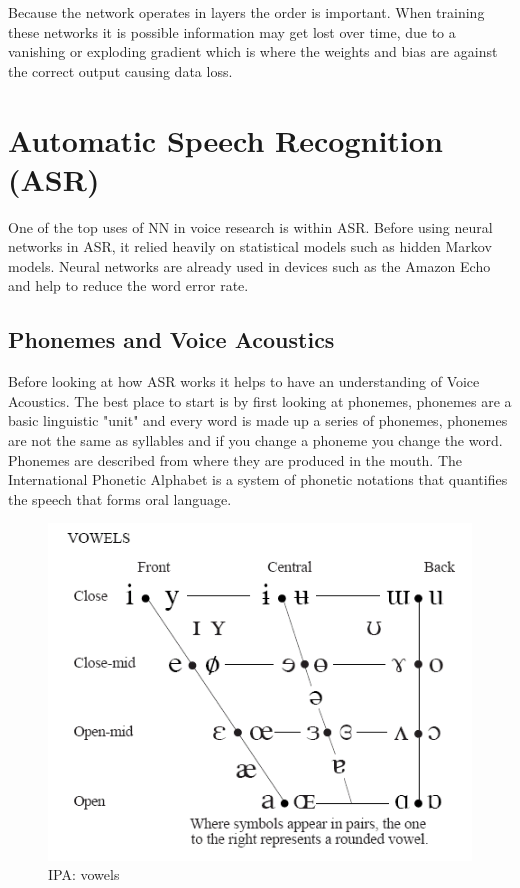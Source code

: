 \documentclass[11pt]{article}
\begin{document}
    Because the network operates in layers the order is important. When training these networks it is possible information may get lost over time, due to a vanishing or exploding gradient which is where the weights and bias are against the correct output causing data loss.
    
    \pagebreak
    
    \section{Automatic Speech Recognition (ASR)}
    
    One of the top uses of NN in voice research is within ASR. Before using neural networks in ASR, it relied heavily on statistical models such as hidden Markov models. Neural networks are already used in devices such as the Amazon Echo \cite{SwarupImprovingEmbeddings} and help to reduce the word error rate.
    
    \subsection{Phonemes and Voice Acoustics}
    Before looking at how ASR works it helps to have an understanding of Voice Acoustics. The best place to start is by first looking at phonemes, phonemes are a basic linguistic "unit" and every word is made up a series of phonemes, phonemes are not the same as syllables and if you change a phoneme you change the word. Phonemes are described from where they are produced in the mouth. The International Phonetic Alphabet is a system of phonetic notations that quantifies the speech that forms oral language. 
    
    \begin{figure}[h]
        \centering
        \includegraphics[scale=0.5]{vowels.png}
        \caption{IPA: vowels \cite{InternationalPhoneticAssociationIPA:Association}}
        \label{fig:vowles}
    \end{figure}
    
\end{document}
